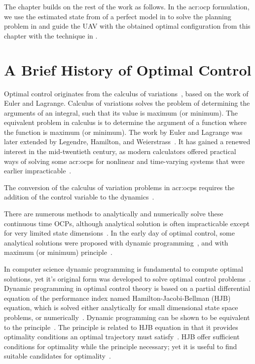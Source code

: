 The chapter builds on the rest of the work as follows. In the \Gls{acr:ocp} formulation, we use the estimated state from  of a perfect model in  to solve the planning problem in  and guide the UAV with the obtained optimal configuration from this chapter with the technique in .

\section{A Brief History of Optimal Control}

Optimal control originates from the calculus of variations~\citep{sethi2019optimal}, based on the work of Euler and Lagrange. Calculus of variations solves the problem of determining the arguments of an integral, such that its value is maximum (or minimum). The equivalent problem in calculus is to determine the argument of a function where the function is maximum (or minimum). The work by Euler and Lagrange was later extended by Legendre, Hamilton, and Weierstrass~\citep{paulen2016solution}. It has gained a renewed interest in the mid-twentieth century, as modern calculators offered practical ways of solving some \Gls{acr:ocp}s for nonlinear and time-varying systems that were earlier impracticable~\citep{bryson1975applied}.

The conversion of the calculus of variation problems in \Gls{acr:ocp}s requires the addition of the control variable to the dynamics~\citep{sethi2019optimal}. 

There are numerous methods to analytically and numerically solve these continuous time OCPs, although analytical solution is often impracticable except for very limited state dimensions~\citep{rawlings2017model}. In the early day of optimal control, some analytical solutions were proposed with dynamic programming~\citep{bellman1957dynamic}, and with maximum (or minimum) principle~\citep{pontryagin1962mathematical}. 

In computer science dynamic programming is fundamental to compute optimal solutions, yet it's original form was developed to solve optimal control problems~\citep{lavalle2006planning}. Dynamic programming in optimal control theory is based on a partial differential equation of the performance index named Hamilton-Jacobi-Bellman (HJB) equation, which is solved either analytically for small dimensional state space problems, or numerically~\citep{rawlings2017model}. Dynamic programming can be shown to be equivalent to the principle~\citep{paulen2016solution}. The principle is related to HJB equation in that it provides optimality conditions an optimal trajectory must satisfy~\citep{lavalle2006planning}. HJB offer sufficient conditions for optimality while the principle necessary; yet it is useful to find suitable candidates for optimality~\citep{lavalle2006planning}.

